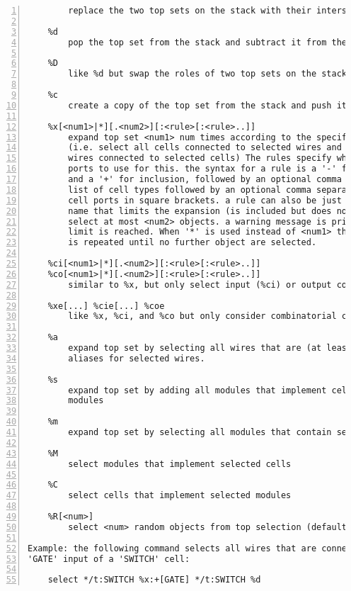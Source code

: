 \begin{lstlisting}[numbers=left,frame=single]
    %i
        replace the two top sets on the stack with their intersection

    %d
        pop the top set from the stack and subtract it from the new top

    %D
        like %d but swap the roles of two top sets on the stack

    %c
        create a copy of the top set from the stack and push it

    %x[<num1>|*][.<num2>][:<rule>[:<rule>..]]
        expand top set <num1> num times according to the specified rules.
        (i.e. select all cells connected to selected wires and select all
        wires connected to selected cells) The rules specify which cell
        ports to use for this. the syntax for a rule is a '-' for exclusion
        and a '+' for inclusion, followed by an optional comma separated
        list of cell types followed by an optional comma separated list of
        cell ports in square brackets. a rule can also be just a cell or wire
        name that limits the expansion (is included but does not go beyond).
        select at most <num2> objects. a warning message is printed when this
        limit is reached. When '*' is used instead of <num1> then the process
        is repeated until no further object are selected.

    %ci[<num1>|*][.<num2>][:<rule>[:<rule>..]]
    %co[<num1>|*][.<num2>][:<rule>[:<rule>..]]
        similar to %x, but only select input (%ci) or output cones (%co)

    %xe[...] %cie[...] %coe
        like %x, %ci, and %co but only consider combinatorial cells

    %a
        expand top set by selecting all wires that are (at least in part)
        aliases for selected wires.

    %s
        expand top set by adding all modules that implement cells in selected
        modules

    %m
        expand top set by selecting all modules that contain selected objects

    %M
        select modules that implement selected cells

    %C
        select cells that implement selected modules

    %R[<num>]
        select <num> random objects from top selection (default 1)

Example: the following command selects all wires that are connected to a
'GATE' input of a 'SWITCH' cell:

    select */t:SWITCH %x:+[GATE] */t:SWITCH %d
\end{lstlisting}

